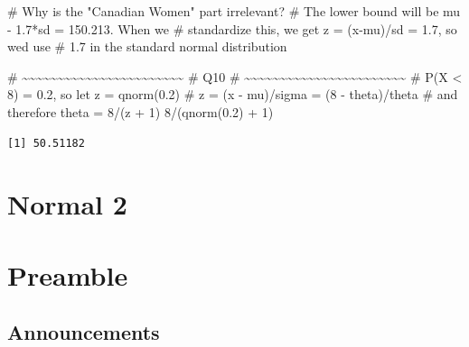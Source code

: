 \documentclass[
  letterpaper,
  DIV=11,
  numbers=noendperiod]{scrreprt}
\newenvironment{Shaded}{\begin{snugshade}}{\end{snugshade}}
\newcommand{\CommentTok}[1]{\textcolor[rgb]{0.37,0.37,0.37}{#1}}
\newcommand{\DecValTok}[1]{\textcolor[rgb]{0.68,0.00,0.00}{#1}}
\newcommand{\FloatTok}[1]{\textcolor[rgb]{0.68,0.00,0.00}{#1}}
\newcommand{\FunctionTok}[1]{\textcolor[rgb]{0.28,0.35,0.67}{#1}}
\newcommand{\NormalTok}[1]{\textcolor[rgb]{0.00,0.23,0.31}{#1}}
\newcommand{\SpecialCharTok}[1]{\textcolor[rgb]{0.37,0.37,0.37}{#1}}
\begin{document}
\begin{Shaded}
\begin{Highlighting}[]
\CommentTok{\# Why is the "Canadian Women" part irrelevant?}
\CommentTok{\# The lower bound will be mu {-} 1.7*sd = 150.213. When we}
\CommentTok{\# standardize this, we get z = (x{-}mu)/sd = 1.7, so we\textquotesingle{}d use}
\CommentTok{\# 1.7 in the standard normal distribution}

\CommentTok{\# \textasciitilde{}\textasciitilde{}\textasciitilde{}\textasciitilde{}\textasciitilde{}\textasciitilde{}\textasciitilde{}\textasciitilde{}\textasciitilde{}\textasciitilde{}\textasciitilde{}\textasciitilde{}\textasciitilde{}\textasciitilde{}\textasciitilde{}\textasciitilde{}\textasciitilde{}\textasciitilde{}\textasciitilde{}\textasciitilde{}\textasciitilde{}\textasciitilde{}\textasciitilde{}}
\CommentTok{\# Q10}
\CommentTok{\# \textasciitilde{}\textasciitilde{}\textasciitilde{}\textasciitilde{}\textasciitilde{}\textasciitilde{}\textasciitilde{}\textasciitilde{}\textasciitilde{}\textasciitilde{}\textasciitilde{}\textasciitilde{}\textasciitilde{}\textasciitilde{}\textasciitilde{}\textasciitilde{}\textasciitilde{}\textasciitilde{}\textasciitilde{}\textasciitilde{}\textasciitilde{}\textasciitilde{}\textasciitilde{}}
\CommentTok{\# P(X \textless{} 8) = 0.2, so let z = qnorm(0.2)}
\CommentTok{\# z = (x {-} mu)/sigma = (8 {-} theta)/theta}
\CommentTok{\# and therefore theta = 8/(z + 1)}
\DecValTok{8}\SpecialCharTok{/}\NormalTok{(}\FunctionTok{qnorm}\NormalTok{(}\FloatTok{0.2}\NormalTok{) }\SpecialCharTok{+} \DecValTok{1}\NormalTok{)}
\end{Highlighting}
\end{Shaded}

\begin{verbatim}
[1] 50.51182
\end{verbatim}

\hypertarget{normal-2}{%
\chapter{Normal 2}\label{normal-2}}

\hypertarget{preamble-3}{%
\chapter{Preamble}\label{preamble-3}}

\hypertarget{announcements-4}{%
\section{Announcements}\label{announcements-4}}
\end{document}
